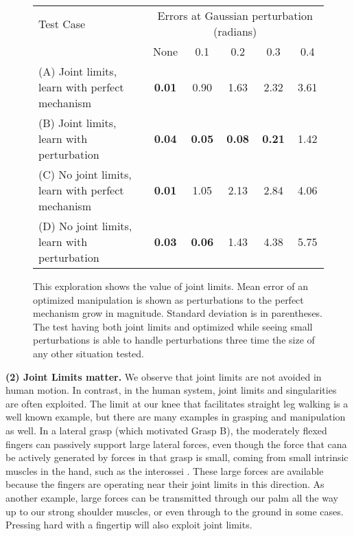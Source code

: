 \begin{figure}
\begin{center}
\begin{tabular}{l|c|c|c|c|c|}
Test Case & \multicolumn{5}{c}{Errors at Gaussian perturbation (radians)}  \\
                & None & 0.1  & 0.2  & 0.3  &  0.4  \\ \hline 
(A) Joint limits, learn with perfect mechanism &	{\bf 0.01} & 0.90 & 1.63 &	2.32 & 3.61 \\
(B) Joint limits, learn with perturbation	&  {\bf 0.04}	& {\bf 0.05}	& {\bf 0.08} &	{\bf 0.21} &	1.42 \\
(C) No joint limits, learn with perfect mechanism &	{\bf 0.01}	&	1.05&	2.13	& 2.84  &	4.06 \\
(D) No joint limits, learn with perturbation &	{\bf 0.03}	& {\bf 0.06} 	&1.43	&4.38	&5.75 \\
\end{tabular}
\end{center}
\caption{This exploration shows the value of joint limits.   Mean error of an optimized manipulation is shown as perturbations to the perfect mechanism grow in magnitude.    Standard deviation is in parentheses.  The test having both joint limits and optimized while seeing small perturbations is able to handle perturbations three time the size of any other situation tested.}
\label{JointLimitAnalysis}
\end{figure}

\smallskip\noindent
{\bf (2) Joint Limits matter.}   We observe that joint limits are not avoided in human motion.   In contrast, in the human system, joint limits and singularities are often exploited.    The limit at our knee that facilitates straight leg walking is a well known example, but there are many examples in grasping and manipulation as well.  In a lateral grasp (which motivated Grasp B), the moderately flexed fingers can passively support large lateral forces, even though the force that cana be actively generated by forces in that grasp is small, coming from small intrinsic muscles in the hand, such as the interossei \cite{brand1999clinical}.   These large forces are available because the fingers are operating near their joint limits in this direction.   As another example, large forces can be transmitted through our palm all the way up to our strong shoulder muscles, or even through to the ground in some cases.   Pressing hard with a fingertip will also exploit joint limits.

